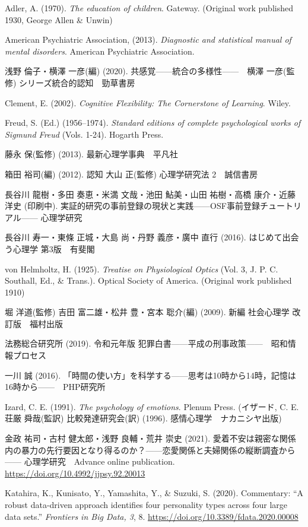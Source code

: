 Adler, A. (1970). \textit{The education of children}. Gateway. (Original work published 1930, George Allen \& Unwin)

American Psychiatric Association, (2013). \textit{Diagnostic and statistical manual of mental disorders}. American Psychiatric Association.

浅野 倫子・横澤 一彦(編)  (2020). 共感覚------統合の多様性------　横澤 一彦(監修) シリーズ統合的認知　勁草書房

Clement, E. (2002). \textit{Cognitive Flexibility: The Cornerstone of Learning}. Wiley.

Freud, S. (Ed.) (1956--1974). \textit{Standard editions of complete psychological works of Sigmund Freud} (Vols. 1-24). Hogarth Press.

藤永 保(監修) (2013). 最新心理学事典　平凡社

箱田 裕司(編) (2012). 認知 大山 正(監修) 心理学研究法 2　誠信書房

長谷川 龍樹・多田 奏恵・米満 文哉・池田 鮎美・山田 祐樹・高橋 康介・近藤 洋史 (印刷中). 実証的研究の事前登録の現状と実践------OSF事前登録チュートリアル------ 心理学研究

長谷川 寿一・東條 正城・大島 尚・丹野 義彦・廣中 直行 (2016). はじめて出会う心理学 第3版　有斐閣

von Helmholtz, H. (1925). \textit{Treatise on Physiological Optics} (Vol. 3, J. P. C. Southall, Ed., \& Trans.). Optical Society of America. (Original work published 1910)

堀 洋道(監修)  吉田 富二雄・松井 豊・宮本 聡介(編) (2009). 新編 社会心理学 改訂版　福村出版

法務総合研究所 (2019). 令和元年版 犯罪白書------平成の刑事政策------　昭和情報プロセス

一川 誠 (2016). 「時間の使い方」を科学する------思考は10時から14時，記憶は16時から------　PHP研究所

Izard, C. E. (1991). \textit{The psychology of emotions}. Plenum Press.
(イザード, C. E. 荘厳 舜哉(監訳) 比較発達研究会(訳) (1996). 感情心理学　ナカニシヤ出版)

金政 祐司・古村 健太郎・浅野 良輔・荒井 崇史 (2021). 愛着不安は親密な関係内の暴力の先行要因となり得るのか？------恋愛関係と夫婦関係の縦断調査から------ 心理学研究　Advance online publication. \url{https://doi.org/10.4992/jjpsy.92.20013}

Katahira, K., Kunisato, Y., Yamashita, Y., \& Suzuki, S. (2020). Commentary: ``A robust data-driven approach identifies four personality types across four large data sets.'' \textit{Frontiers in Big Data, 3}, 8. \url{https://doi.org/10.3389/fdata.2020.00008}

